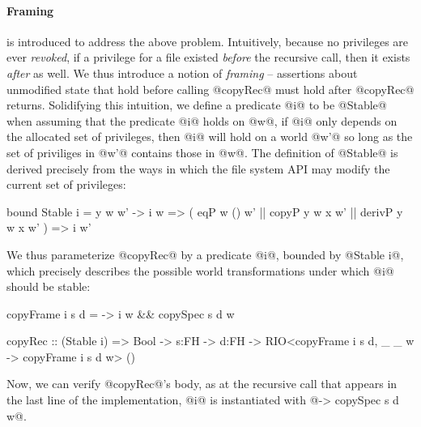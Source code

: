 \paragraph{Framing} is introduced to address the above problem.
Intuitively, because no privileges are ever
\emph{revoked}, if a privilege for a file existed \emph{before} the
recursive call, then it exists \emph{after} as well.
%
We thus introduce a notion of \emph{framing} -- assertions about
unmodified state that hold before calling @copyRec@ must hold after
@copyRec@ returns.
%
Solidifying this intuition, we define a predicate @i@ to be @Stable@
when assuming that the predicate @i@
holds on @w@, if @i@ only depends on the allocated set of 
privileges, then @i@ will hold on a world @w'@ so long as
the set of priviliges in @w'@ contains those in @w@.
%
The definition of @Stable@ is derived precisely from the ways in which
the file system API may modify the current set of privileges:
%
\begin{code}
  bound Stable i = \x y w w' -> 
   i w => ( eqP w () w' || copyP y w x w'
           || derivP y w x w'
          ) => i w'
\end{code}
%
We thus parameterize @copyRec@ by a predicate @i@, bounded by @Stable i@, 
which precisely describes the possible world transformations under which 
@i@ should be stable:
%
\begin{code}
  copyFrame i s d = \w -> i w && copySpec s d w

  copyRec :: (Stable i) => 
             Bool -> s:FH -> d:FH ->
             RIO<copyFrame i s d,
                 \_ _ w -> copyFrame i s d w> () 
\end{code}              
%
Now, we can verify @copyRec@'s body, as
at the recursive call that appears in the last line of the implementation,
@i@ is instantiated with 
%
@\w -> copySpec s d w@.

